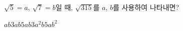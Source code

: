 $\sqrt{5}=a$, $\sqrt{7}=b$일 때, $\sqrt{315}$를 $a$, $b$를 사용하여 나타내면?
\begin{choices32}{$ab$}{$3ab$}{$5ab$}{$3a^2b$}{$5ab^2$}\end{choices32}
